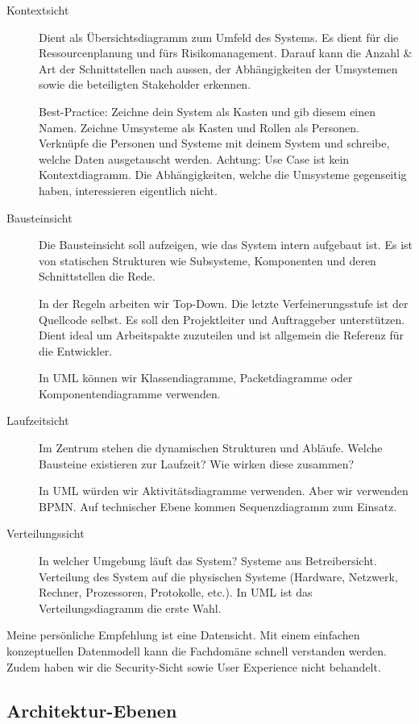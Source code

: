 \begin{description}
	\item[Kontextsicht] Dient als Übersichtsdiagramm zum Umfeld des Systems. Es dient für die Ressourcenplanung und fürs Risikomanagement. Darauf kann die Anzahl \& Art der Schnittstellen nach aussen, der Abhängigkeiten der Umsystemen sowie die beteiligten Stakeholder erkennen.
	
	Best-Practice: Zeichne dein System als Kasten und gib diesem einen Namen. Zeichne Umsysteme als Kasten und Rollen als Personen. Verknüpfe die Personen und Systeme mit deinem System und schreibe, welche Daten ausgetauscht werden. Achtung: Use Case ist kein Kontextdiagramm. Die Abhängigkeiten, welche die Umsysteme gegenseitig haben, interessieren eigentlich nicht.
	
	\item[Bausteinsicht] Die Bausteinsicht soll aufzeigen, wie das System intern aufgebaut ist. Es ist von statischen Strukturen wie Subsysteme, Komponenten und deren Schnittstellen die Rede.
	
	In der Regeln arbeiten wir Top-Down. Die letzte Verfeinerungsstufe ist der Quellcode selbst. Es soll den Projektleiter und Auftraggeber unterstützen. Dient ideal um Arbeitspakte zuzuteilen und ist allgemein die Referenz für die Entwickler.
	
	In UML können wir Klassendiagramme, Packetdiagramme oder Komponentendiagramme verwenden.
	
	\item[Laufzeitsicht] Im Zentrum stehen die dynamischen Strukturen und Abläufe. Welche Bausteine existieren zur Laufzeit? Wie wirken diese zusammen?
	
	In UML würden wir Aktivitätsdiagramme verwenden. Aber wir verwenden BPMN. Auf technischer Ebene kommen Sequenzdiagramm zum Einsatz.
	
	\item[Verteilungssicht] In welcher Umgebung läuft das System? Systeme aus Betreibersicht. Verteilung des System auf die physischen Systeme (Hardware, Netzwerk, Rechner, Prozessoren, Protokolle, etc.). In UML ist das Verteilungsdiagramm die erste Wahl.
\end{description}

Meine persönliche Empfehlung ist eine Datensicht. Mit einem einfachen konzeptuellen Datenmodell kann die Fachdomäne schnell verstanden werden. Zudem haben wir die Security-Sicht sowie User Experience nicht behandelt.

\subsection{Architektur-Ebenen}

